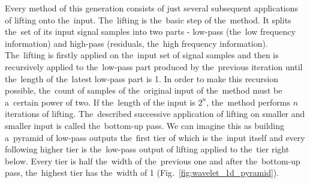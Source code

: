 Every method of this generation consists of just several subsequent applications of lifting onto the~input. The~lifting is the~basic step of the~method. It splits the~set of its input signal samples into two parts - low-pass (the~low frequency information) and high-pass (residuals, the~high frequency information). The~lifting is firstly applied on the~input set of signal samples and then is recursively applied to the~low-pass part produced by the~previous iteration until the~length of the~latest low-pass part is 1. In order to make this recursion possible, the~count of samples of the~original input of the~method must be a~certain power of two. If the~length of the input is $2^n$, the~method performs $n$ iterations of lifting. The~described successive application of lifting on smaller and smaller input is called the~bottom-up pass. We can imagine this as building a~pyramid of low-pass outputs the~first tier of which is the~input itself and every following higher tier is the~low-pass output of lifting applied to the~tier right below. Every tier is half the~width of the~previous one and after the~bottom-up pass, the~highest tier has the~width of 1 (Fig.~\ref{fig:wavelet_1d_pyramid}).

